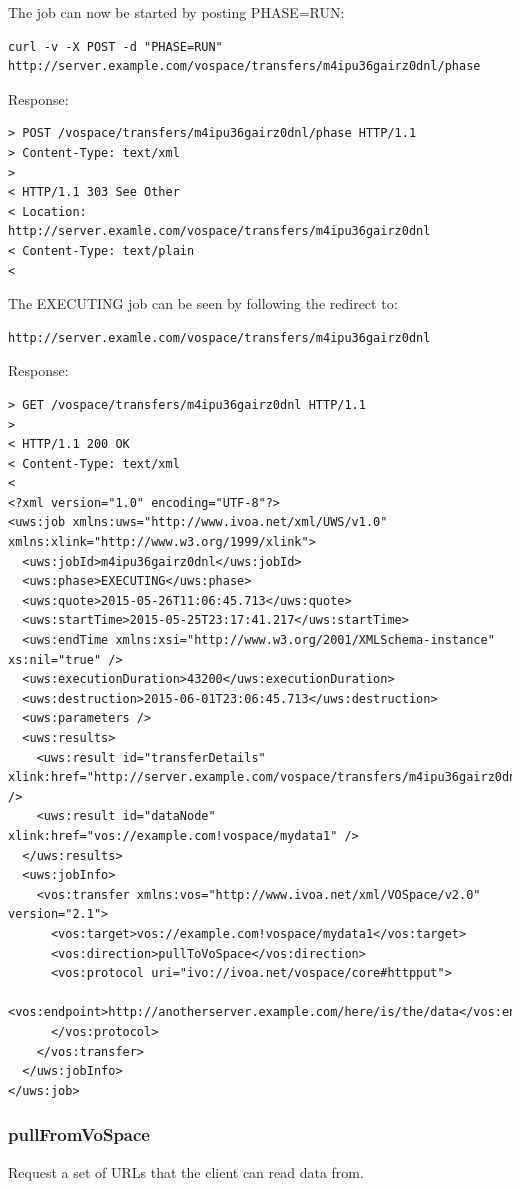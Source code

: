 \documentclass[11pt,a4paper]{ivoa}
\begin{document}
The job can now be started by posting PHASE=RUN:
\begin{lstlisting}
curl -v -X POST -d "PHASE=RUN" http://server.example.com/vospace/transfers/m4ipu36gairz0dnl/phase
\end{lstlisting}
Response:
\begin{lstlisting}
> POST /vospace/transfers/m4ipu36gairz0dnl/phase HTTP/1.1
> Content-Type: text/xml
>
< HTTP/1.1 303 See Other
< Location: http://server.examle.com/vospace/transfers/m4ipu36gairz0dnl
< Content-Type: text/plain
<
\end{lstlisting}
The EXECUTING job can be seen by following the redirect to:
\begin{lstlisting}
http://server.examle.com/vospace/transfers/m4ipu36gairz0dnl
\end{lstlisting}
Response:
\begin{lstlisting}
> GET /vospace/transfers/m4ipu36gairz0dnl HTTP/1.1
>
< HTTP/1.1 200 OK
< Content-Type: text/xml
<
<?xml version="1.0" encoding="UTF-8"?>
<uws:job xmlns:uws="http://www.ivoa.net/xml/UWS/v1.0" xmlns:xlink="http://www.w3.org/1999/xlink">
  <uws:jobId>m4ipu36gairz0dnl</uws:jobId>
  <uws:phase>EXECUTING</uws:phase>
  <uws:quote>2015-05-26T11:06:45.713</uws:quote>
  <uws:startTime>2015-05-25T23:17:41.217</uws:startTime>
  <uws:endTime xmlns:xsi="http://www.w3.org/2001/XMLSchema-instance" xs:nil="true" />
  <uws:executionDuration>43200</uws:executionDuration>
  <uws:destruction>2015-06-01T23:06:45.713</uws:destruction>
  <uws:parameters />
  <uws:results>
    <uws:result id="transferDetails" xlink:href="http://server.example.com/vospace/transfers/m4ipu36gairz0dnl/results/transferDetails" />
    <uws:result id="dataNode" xlink:href="vos://example.com!vospace/mydata1" />
  </uws:results>
  <uws:jobInfo>
    <vos:transfer xmlns:vos="http://www.ivoa.net/xml/VOSpace/v2.0" version="2.1">
      <vos:target>vos://example.com!vospace/mydata1</vos:target>
      <vos:direction>pullToVoSpace</vos:direction>
      <vos:protocol uri="ivo://ivoa.net/vospace/core#httpput">
        <vos:endpoint>http://anotherserver.example.com/here/is/the/data</vos:endpoint>
      </vos:protocol>
    </vos:transfer>
  </uws:jobInfo>
</uws:job>
\end{lstlisting}

\subsubsection{pullFromVoSpace}
\label{subsubsec:pullfromvospace}
Request a set of URLs that the client can read data from.
\end{document}
